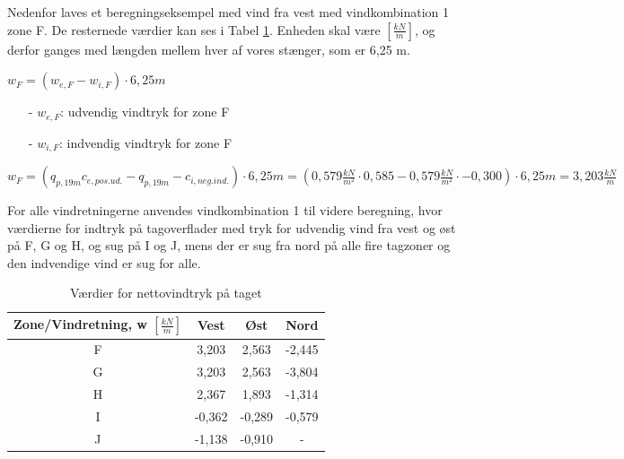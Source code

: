 Nedenfor laves et beregningseksempel med vind fra vest med vindkombination 1 zone F. De resternede værdier kan ses i Tabel \ref{tab:bb}.
\newline
\newline
Enheden skal være $[\frac{kN}{m}]$, og derfor ganges med længden mellem hver af vores stænger, som er 6,25 m.

\begin{center} 
	$w_F=(w_{e,F}-w_{i,F})\cdot 6,\!25 m$
\end{center}

\begin{itemize}
	\item[-] $w_{e,F}$: udvendig vindtryk for zone F
	\item[-] $w_{i,F}$: indvendig vindtryk for zone F
\end{itemize}

\begin{center} 
	$w_F=(q_{p,19 m}c_{e,pos. ud.}-q_{p,19 m}-c_{i,neg. ind.})\cdot 6,\!25 m = (0,\!579 \frac{kN}{m^2}\cdot 0,\!585 - 0,\!579 \frac{kN}{m^2}\cdot -0,\!300)\cdot 6,\!25 m = 3,\!203 \frac{kN}{m}$
\end{center}

For alle vindretningerne anvendes vindkombination 1 til videre beregning, hvor værdierne for indtryk på tagoverflader med tryk for udvendig vind fra vest og øst på F, G og H, og sug på I og J, mens der er sug fra nord på alle fire tagzoner og den indvendige vind er sug for alle.

\begin{table}[htb]
	\begin{center}
		\begin{tabular}{ |c|c|c|c| } 
			\hline
			Zone/Vindretning, w $[\frac{kN}{m}]$ & Vest & Øst & Nord \\	\hline
			F & 3,203 & 2,563 & -2,445 \\	\hline
			G & 3,203 & 2,563 & -3,804 \\	\hline 
			H & 2,367 & 1,893 & -1,314 \\ 	\hline
			I & -0,362 & -0,289 & -0,579 \\	\hline
			J & -1,138 & -0,910 & - \\	\hline
		\end{tabular}
		\caption{Værdier for nettovindtryk på taget}
		\label{tab:bb}
	\end{center}
\end{table}

